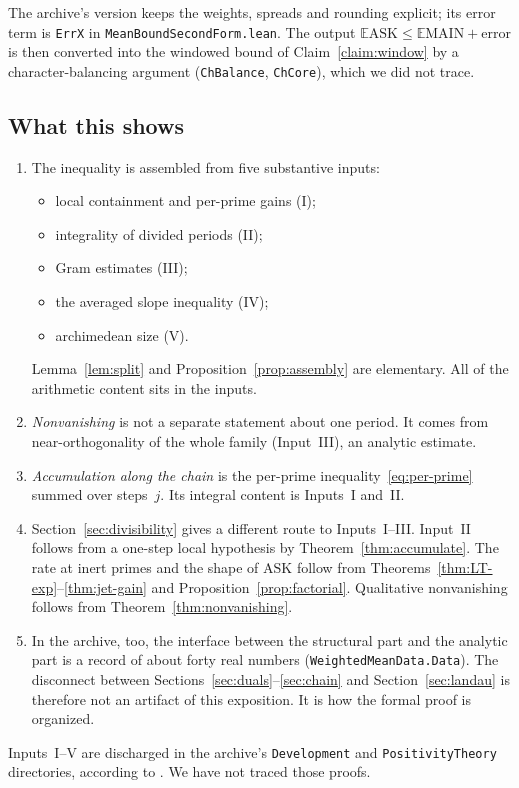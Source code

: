 \documentclass[11pt]{amsart}
\theoremstyle{definition}
\theoremstyle{remark}
\newcommand{\ASK}{\mathrm{ASK}}
\newcommand{\MAIN}{\mathrm{MAIN}}
\begin{document}
The archive's version keeps the weights, spreads and rounding explicit; its error term is \texttt{ErrX} in \texttt{MeanBoundSecondForm.lean}. The output $\mathbb E\ASK\le\mathbb E\MAIN+\mathrm{error}$ is then converted into the windowed bound of Claim~\ref{claim:window} by a character-balancing argument (\texttt{ChBalance}, \texttt{ChCore}), which we did not trace.

\subsection{What this shows}
\begin{enumerate}[label=(\arabic*)]
\item The inequality is assembled from five substantive inputs:
\begin{itemize}
\item local containment and per-prime gains (I);
\item integrality of divided periods (II);
\item Gram estimates (III);
\item the averaged slope inequality (IV);
\item archimedean size (V).
\end{itemize}
Lemma~\ref{lem:split} and Proposition~\ref{prop:assembly} are elementary. All of the arithmetic content sits in the inputs.
\item \emph{Nonvanishing} is not a separate statement about one period. It comes from near-orthogonality of the whole family (Input~III), an analytic estimate.
\item \emph{Accumulation along the chain} is the per-prime inequality~\eqref{eq:per-prime} summed over steps~$j$. Its integral content is Inputs~I and~II.
\item Section~\ref{sec:divisibility} gives a different route to Inputs~I--III. Input~II follows from a one-step local hypothesis by Theorem~\ref{thm:accumulate}. The rate at inert primes and the shape of $\ASK$ follow from Theorems~\ref{thm:LT-exp}--\ref{thm:jet-gain} and Proposition~\ref{prop:factorial}. Qualitative nonvanishing follows from Theorem~\ref{thm:nonvanishing}.
\item In the archive, too, the interface between the structural part and the analytic part is a record of about forty real numbers (\texttt{WeightedMeanData.Data}). The disconnect between Sections~\ref{sec:duals}--\ref{sec:chain} and Section~\ref{sec:landau} is therefore not an artifact of this exposition. It is how the formal proof is organized.
\end{enumerate}
Inputs~I--V are discharged in the archive's \texttt{Development} and \texttt{PositivityTheory} directories, according to \cite{golf}. We have not traced those proofs.
\end{document}
